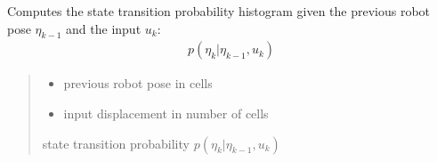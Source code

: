 \documentclass[letterpaper,10pt,english]{sphinxmanual}
\begin{document}
\begin{fulllineitems}
\begin{fulllineitems}
\end{fulllineitems}


\begin{fulllineitems}
\label{\detokenize{GridLocalization:GL_4DOFAUV.GL_4DOFAUV.StateTransitionProbability_4_xk_1_uk}}
\pysigstartsignatures
{}
\pysigstopsignatures
\sphinxAtStartPar
Computes the state transition probability histogram given the previous robot pose \(\eta_{k-1}\) and the input \(u_k\):
\begin{equation*}
\begin{split}p(\eta_k | \eta_{k-1}, u_k)\end{split}
\end{equation*}\begin{quote}\begin{description}
\begin{itemize}
\item {} 
\sphinxAtStartPar
{} \textendash{} previous robot pose in cells

\item {} 
\sphinxAtStartPar
{} \textendash{} input displacement in number of cells

\end{itemize}

\sphinxAtStartPar
state transition probability \(p(\eta_k | \eta_{k-1}, u_k)\)

\end{description}\end{quote}

\end{fulllineitems}



\end{fulllineitems}
\end{document}
